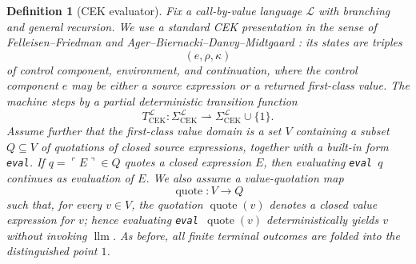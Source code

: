\documentclass[11pt]{article}
\newtheorem{definition}{Definition}[section]
\newcommand{\quoteop}{\operatorname{quote}}
\newcommand{\llm}{\operatorname{llm}}
\begin{document}
\begin{definition}[CEK evaluator]\label{def:cek}
Fix a call-by-value language $\mathcal{L}$ with branching and general recursion. We use a standard CEK presentation in the sense of Felleisen--Friedman and Ager--Biernacki--Danvy--Midtgaard \cite{FelleisenFriedman86,AgerEtAl03}: its states are triples
\[
(e,\rho,\kappa)
\]
of control component, environment, and continuation, where the control component $e$ may be either a source expression or a returned first-class value. The machine steps by a partial deterministic transition function
\[
T_{\mathrm{CEK}}^{\mathcal{L}}: \Sigma_{\mathrm{CEK}}^{\mathcal{L}} \rightharpoonup \Sigma_{\mathrm{CEK}}^{\mathcal{L}}\cup\{1\}.
\]
Assume further that the first-class value domain is a set $V$ containing a subset $Q\subseteq V$ of quotations of closed source expressions, together with a built-in form \texttt{eval}. If $q=\ulcorner E\urcorner\in Q$ quotes a closed expression $E$, then evaluating \texttt{eval} $\,q$ continues as evaluation of $E$. We also assume a value-quotation map
\[
\quoteop:V\to Q
\]
such that, for every $v\in V$, the quotation $\quoteop(v)$ denotes a closed value expression for $v$; hence evaluating \texttt{eval} $\,\quoteop(v)$ deterministically yields $v$ without invoking $\llm$. As before, all finite terminal outcomes are folded into the distinguished point $1$.
\end{definition}
\end{document}
